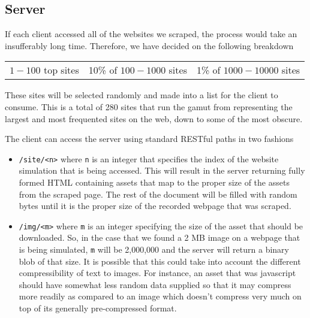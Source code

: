 \documentclass[11pt,letterpaper,notitlepage]{article}
\begin{document}
\subsection{Server}
\label{sec:project/server}
If each client accessed all of the websites we scraped, the process would take
an insufferably long time.  Therefore, we have decided on the following
breakdown
\begin{center}
\begin{tabular}{ccc}
$1-100$ top sites & 10\% of $100-1000$ sites & 1\% of $1000-10000$ sites \\
\end{tabular}
\end{center}

These sites will be selected randomly and made into a list for the client to
consume. This is a total of 280 sites that run the gamut from representing the
largest and most frequented sites on the web, down to some of the most obscure.

The client can access the server using standard RESTful paths in two fashions
\begin{itemize}
\item \texttt{/site/<n>} where \texttt{n} is an integer that specifies the index
of the website simulation that is being accessed.  This will result in the
server returning fully formed HTML containing assets that map to the proper size
of the assets from the scraped page.  The rest of the document will be filled
with random bytes until it is the proper size of the recorded webpage that was
scraped.
\item \texttt{/img/<m>} where \texttt{m} is an integer specifying the size of the
asset that should be downloaded. So, in the case that we found a 2 MB image on a
webpage that is being simulated, \texttt{m} will be 2,000,000 and the server
will return a binary blob of that size. It is possible that this could take into
account the different compressibility of text to images.  For instance, an asset
that was javascript should have somewhat less random data supplied so that it
may compress more readily as compared to an image which doesn't compress very
much on top of its generally pre-compressed format.
\end{itemize}

\end{document}
